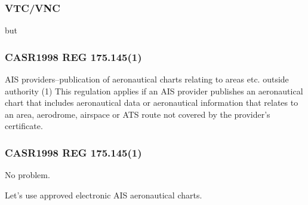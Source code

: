 \begin{frame}
\frametitle{VTC/VNC}
\large
\begin{center}
but
\end{center}
\end{frame}

\begin{frame}
\frametitle{CASR1998 REG 175.145(1)}
\begin{block}{AIS providers--publication of aeronautical charts relating to areas etc. outside authority}
(1) This regulation applies if an AIS provider publishes an aeronautical chart that includes aeronautical data or aeronautical information that relates to an area, aerodrome, airspace or ATS route not covered by the provider's certificate.
\end{block}
\end{frame}

\begin{frame}
\frametitle{CASR1998 REG 175.145(1)}
\large
\begin{center}
No problem.
\par
Let's use approved electronic AIS aeronautical charts.
\end{center}
\end{frame}

